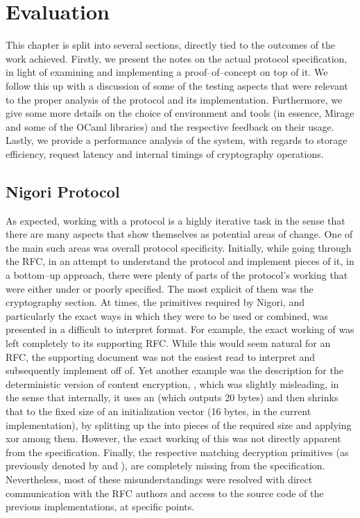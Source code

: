 \chapter{Evaluation} \label{chapter:evaluation}
This chapter is split into several sections, directly tied to the outcomes of the work achieved.
Firstly, we present the notes on the actual protocol specification, in light of examining and implementing a proof--of--concept on top of it.
We follow this up with a discussion of some of the testing aspects that were relevant to the proper analysis of the protocol and its implementation.
Furthermore, we give some more details on the choice of environment and tools (in essence, Mirage and some of the OCaml libraries) and the respective feedback on their usage.
Lastly, we provide a performance analysis of the system, with regards to storage efficiency, request latency and internal timings of cryptography operations.

\section{Nigori Protocol} \label{sec:evaluation:protocol}
As expected, working with a \wip protocol is a highly iterative task in the sense that there are many aspects that show themselves as potential areas of change.
One of the main such areas was overall protocol specificity.
Initially, while going through the RFC, in an attempt to understand the protocol and implement pieces of it, in a bottom--up approach, there were plenty of parts of the protocol's working that were either under or poorly specified.
The most explicit of them was the cryptography section.
At times, the primitives required by Nigori, and particularly the exact ways in which they were to be used or combined, was presented in a difficult to interpret format.
For example, the exact working of  was left completely to its supporting RFC.
While this would seem natural for an RFC, the supporting document was not the easiest read to interpret and subsequently implement off of.
Yet another example was the description for the deterministic version of content encryption, , which was slightly misleading, in the sense that internally, it uses an  (which outputs 20 bytes) and then shrinks that to the fixed size of an  initialization vector (16 bytes, in the current implementation), by splitting up the  into pieces of the required size and applying xor among them.
However, the exact working of this was not directly apparent from the specification.
Finally, the respective matching decryption primitives (as previously denoted by  and ), are completely missing from the specification.
Nevertheless, most of these misunderstandings were resolved with direct communication with the RFC authors and access to the source code of the previous implementations, at specific points.

